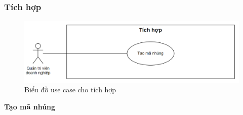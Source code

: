 \subsubsection{Tích hợp}
\begin{figure}[H]
    \centering
    \includegraphics[width=1\linewidth]{Dg_UC/tichhop.png}
    \vspace{0.5cm}
    \caption{Biểu đồ use case cho tích hợp}
    \label{fig:enter-label}
\end{figure}
\textbf{Tạo mã nhúng}

